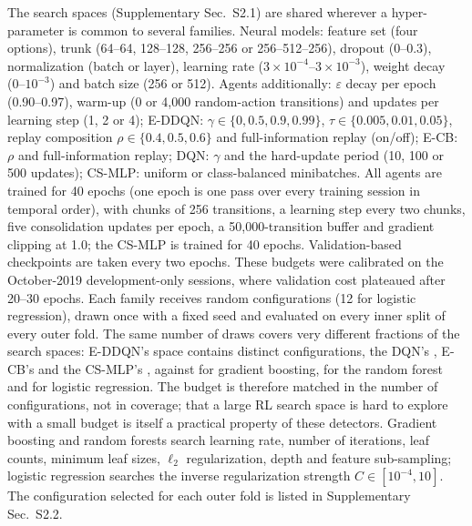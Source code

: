 The search spaces (Supplementary Sec.~S2.1) are shared wherever a hyper-parameter is common to several families. Neural models: feature set (four options), trunk (64--64, 128--128, 256--256 or 256--512--256), dropout (0--0.3), normalization (batch or layer), learning rate ($3\times10^{-4}$--$3\times10^{-3}$), weight decay (0--$10^{-3}$) and batch size (256 or 512). Agents additionally: $\varepsilon$ decay per epoch (0.90--0.97), warm-up (0 or 4,000 random-action transitions) and updates per learning step (1, 2 or 4); E-DDQN: $\gamma\in\{0,0.5,0.9,0.99\}$, $\tau\in\{0.005,0.01,0.05\}$, replay composition $\rho\in\{0.4,0.5,0.6\}$ and full-information replay (on/off); E-CB: $\rho$ and full-information replay; DQN: $\gamma$ and the hard-update period (10, 100 or 500 updates); CS-MLP: uniform or class-balanced minibatches. All agents are trained for 40 epochs (one epoch is one pass over every training session in temporal order), with chunks of 256 transitions, a learning step every two chunks, five consolidation updates per epoch, a 50,000-transition buffer and gradient clipping at 1.0; the CS-MLP is trained for 40 epochs. Validation-based checkpoints are taken every two epochs. These budgets were calibrated on the October-2019 development-only sessions, where validation cost plateaued after 20--30 epochs. Each family receives \HPOBudget{} random configurations (12 for logistic regression), drawn once with a fixed seed and evaluated on every inner split of every outer fold. The same number of draws covers very different fractions of the search spaces: E-DDQN's space contains \PHSpaceEDDQN{} distinct configurations, the DQN's \PHSpaceDQN, E-CB's \PHSpaceECB{} and the CS-MLP's \PHSpaceCSMLP, against \PHSpaceHGB{} for gradient boosting, \PHSpaceRF{} for the random forest and \PHSpaceLR{} for logistic regression. The budget is therefore matched in the number of configurations, not in coverage; that a large RL search space is hard to explore with a small budget is itself a practical property of these detectors. Gradient boosting and random forests search learning rate, number of iterations, leaf counts, minimum leaf sizes, $\ell_2$ regularization, depth and feature sub-sampling; logistic regression searches the inverse regularization strength $C\in[10^{-4},10]$. The configuration selected for each outer fold is listed in Supplementary Sec.~S2.2.

